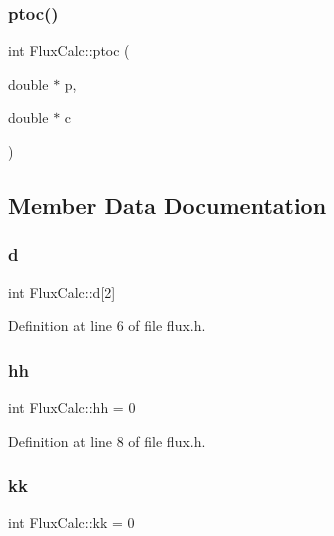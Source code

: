 \subsubsection{\texorpdfstring{ptoc()}{ptoc()}}
{\footnotesize\ttfamily int Flux\+Calc\+::ptoc (\begin{DoxyParamCaption}\item[{double $\ast$}]{p,  }\item[{double $\ast$}]{c }\end{DoxyParamCaption})}



\subsection{Member Data Documentation}
\mbox{\label{classFluxCalc_ac44e4140213abf567f65bc8dcc40f27e}} 
\subsubsection{\texorpdfstring{d}{d}}
{\footnotesize\ttfamily int Flux\+Calc\+::d\mbox{[}2\mbox{]}\hspace{0.3cm}{\ttfamily [private]}}



Definition at line 6 of file flux.\+h.

\mbox{\label{classFluxCalc_ad38bd04c6117848ca7059b3de8dec73e}} 
\subsubsection{\texorpdfstring{hh}{hh}}
{\footnotesize\ttfamily int Flux\+Calc\+::hh = 0\hspace{0.3cm}{\ttfamily [private]}}



Definition at line 8 of file flux.\+h.

\mbox{\label{classFluxCalc_a8503243c4a069efba273a5d711354f22}} 
\subsubsection{\texorpdfstring{kk}{kk}}
{\footnotesize\ttfamily int Flux\+Calc\+::kk = 0\hspace{0.3cm}{\ttfamily [private]}}



